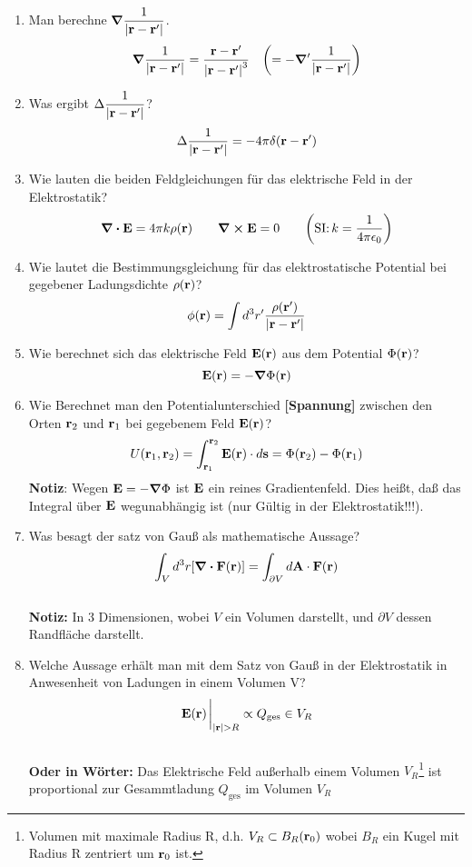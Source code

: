 \documentclass{scrartcl}
\newcommand{\rr}[1]{\frac{#1}{\abs{\vb{r}-\vb{r}'}}}
\newcommand{\ds}{\displaystyle}
\begin{document}
  \begin{enumerate}
    \item Man berechne $\ds \grad\rr{1}$.
          $$\ds \grad\rr{1}=
           \frac{\vb r -\vb r'}{\abs{\vb r - \vb r'}^3}\quad
           \qty(=-\grad'\rr{1})$$

    \item Was ergibt $\ds \Delta\rr{1}$?
          $$\ds \Delta \rr{1} = -4\pi \delta(\vb r-\vb r')$$
      
    \item Wie lauten die beiden Feldgleichungen für das 
          elektrische Feld in der Elektrostatik?
          $$\ds \div \vb E=4\pi k\rho(\vb r)\qquad\curl\vb E=0
           \qquad\qty(\text{SI:}\,k=\frac{1}{4\pi\epsilon_0})$$
    
    \item Wie lautet die Bestimmungsgleichung für das elektrostatische 
          Potential bei gegebener Ladungsdichte $\rho(\vb r)$?
          $$\ds \phi(\vb r)=\int d^3r'\rr{\rho(\vb r')}$$

    \item Wie berechnet sich das elektrische Feld $\vb E (\vb r)$ aus dem
          Potential $\Phi(\vb r)$?
          $$\ds \vb E(\vb r) = - \grad \Phi (\vb r)$$

    \item Wie Berechnet man den Potentialunterschied \textbf{[Spannung]}
          zwischen den Orten 
          $\vb r_2$ und $\vb r_1$ bei gegebenem Feld $\vb E(\vb r)$?
          $$\ds U(\vb r_1, \vb r_2)=\int_{\vb r_1}^{\vb r_2}
           \vb E(\vb r)\cdot d\vb s
           =\Phi(\vb r_2)-\Phi(\vb r_1)$$
          \textbf{Notiz}: Wegen $\vb E=-\grad\Phi$ ist $\vb E$ ein reines
          Gradientenfeld. Dies heißt, daß das Integral über $\vb E$
          wegunabhängig ist (nur Gültig in der Elektrostatik!!!).

    \item Was besagt der satz von Gauß als mathematische Aussage?
          $$\ds \int_V d^3r \qty[\div \vb F(\vb r)]=
           \int_{\partial V}d\vb A\cdot \vb F(\vb r)$$\\
          \textbf{Notiz:} In 3 Dimensionen, wobei $V$ ein Volumen darstellt,
          und $\partial V$ dessen Randfläche darstellt.

    \item Welche Aussage erhält man mit dem Satz von Gauß in der 
          Elektrostatik in Anwesenheit von Ladungen in einem Volumen V?
          $$\vb E(\vb r)\eval_{\abs{\vb r} > R}
            \propto Q_{\text{ges}}\in V_R$$\\
          \textbf{Oder in Wörter:} Das Elektrische Feld außerhalb 
          einem Volumen 
          $V_R$\footnote{Volumen mit 
            maximale Radius R, d.h. $V_R\subset B_R(\vb r_0)$ 
            wobei $B_R$ ein Kugel mit Radius R zentriert um $\vb r_0$ ist.}
          ist proportional zur Gesammtladung $Q_{\text{ges}}$ 
          im Volumen $V_R$


\end{enumerate}
\end{document}
